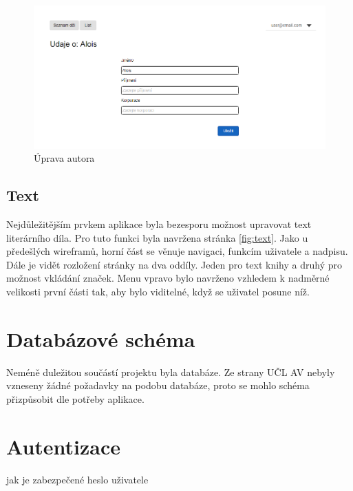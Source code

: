             \begin {figure}[H]\centering
                \includegraphics[width=\textwidth]{images/edit}
                \caption {Úprava autora}
                \label {fig:edit}
            \end{figure}
            
        \subsection{Text}
            Nejdůležitějším prvkem aplikace byla bezesporu možnost upravovat text literárního díla. Pro tuto funkci byla navržena stránka \ref{fig:text}. Jako u předešlých wireframů, horní část se věnuje navigaci, funkcím uživatele a nadpisu. Dále je vidět rozložení stránky na dva oddíly. Jeden pro text knihy a druhý pro možnost vkládání značek. Menu vpravo bylo navrženo vzhledem k nadměrné velikosti první části tak, aby bylo viditelné, když se uživatel posune níž.
            
    \section{Databázové schéma}
        Neméně duležitou součástí projektu byla databáze. Ze strany UČL AV nebyly vzneseny žádné požadavky na podobu databáze, proto se mohlo schéma přizpůsobit dle potřeby aplikace.
        
    \section{Autentizace}
        jak je zabezpečené heslo uživatele
